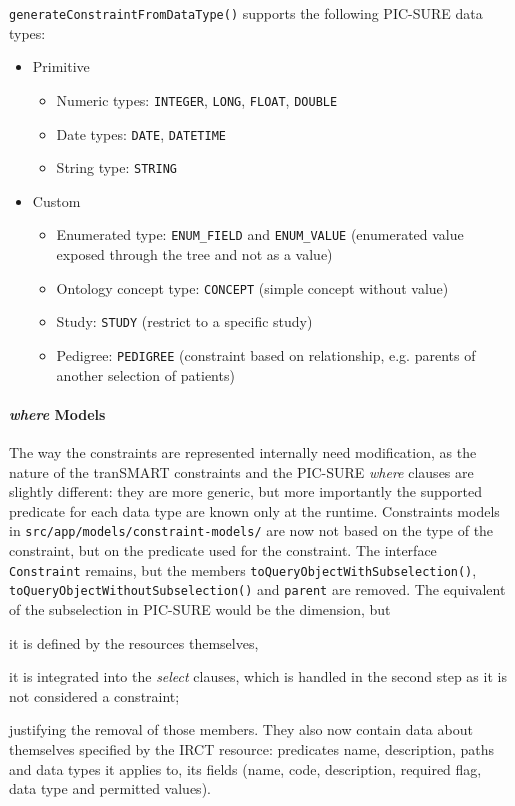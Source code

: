 \verb|generateConstraintFromDataType()| supports the following PIC-SURE data types:
\begin{itemize}
\item Primitive
    \begin{itemize}
        \item Numeric types: \verb|INTEGER|, \verb|LONG|, \verb|FLOAT|, \verb|DOUBLE|
        \item Date types: \verb|DATE|, \verb|DATETIME|
        \item String type: \verb|STRING|
    \end{itemize}

\item Custom
    \begin{itemize}
        \item Enumerated type: \verb|ENUM_FIELD| and \verb|ENUM_VALUE| (enumerated value exposed through the tree and not as a value)
        \item Ontology concept type: \verb|CONCEPT| (simple concept without value)
        \item Study: \verb|STUDY| (restrict to a specific study)
        \item Pedigree: \verb|PEDIGREE| (constraint based on relationship, e.g. parents of another selection of patients)
    \end{itemize}
\end{itemize}


\paragraph{\emph{where} Models}

The way the constraints are represented internally need modification, as the nature of the tranSMART constraints and the PIC-SURE \emph{where} clauses are slightly different: they are more generic, but more importantly the supported predicate for each data type are known only at the runtime.
Constraints models in \verb|src/app/models/constraint-models/| are now not based on the type of the constraint, but on the predicate used for the constraint.
The interface \verb|Constraint| remains, but the members \verb|toQueryObjectWithSubselection()|, \verb|toQueryObjectWithoutSubselection()| and \verb|parent| are removed.
The equivalent of the subselection in PIC-SURE would be the dimension, but 
\begin{enumerate*}[label=(\arabic*)]
  \item it is defined by the resources themselves,
  \item it is integrated into the \emph{select} clauses, which is handled in the second step as it is not considered a constraint;
\end{enumerate*}
justifying the removal of those members.
They also now contain data about themselves specified by the IRCT resource: predicates name, description, paths and data types it applies to, its fields (name, code, description, required flag, data type and permitted values).

